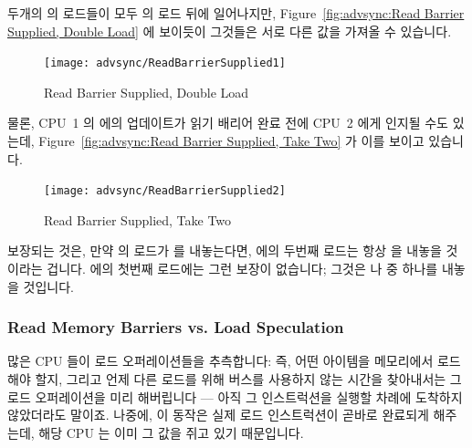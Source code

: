 \begin{enumerate}
두개의  의 로드들이 모두  의 로드 뒤에 일어나지만,
Figure~\ref{fig:advsync:Read Barrier Supplied, Double Load} 에 보이듯이
그것들은 서로 다른 값을 가져올 수 있습니다.

\begin{figure}[htbp]
\centering
\texttt{[image: advsync/ReadBarrierSupplied1]}
\caption{Read Barrier Supplied, Double Load}
\end{figure}

물론, CPU~1 의  에의 업데이트가 읽기 배리어 완료 전에 CPU~2 에게 인지될
수도 있는데, Figure~\ref{fig:advsync:Read Barrier Supplied, Take Two} 가 이를
보이고 있습니다.

\begin{figure}[htbp]
\centering
\texttt{[image: advsync/ReadBarrierSupplied2]}
\caption{Read Barrier Supplied, Take Two}
\end{figure}

보장되는 것은, 만약  의 로드가  를 내놓는다면,  에의
두번째 로드는 항상  을 내놓을 것이라는 겁니다.
 에의 첫번째 로드에는 그런 보장이 없습니다; 그것은  나
 중 하나를 내놓을 것입니다.

\subsubsection{Read Memory Barriers vs. Load Speculation}
\label{sec:advsync:Read Memory Barriers vs. Load Speculation}

많은 CPU 들이 로드 오퍼레이션들을 추측합니다: 즉, 어떤 아이템을 메모리에서
로드해야 할지, 그리고 언제 다른 로드를 위해 버스를 사용하지 않는 시간을
찾아내서는 그 로드 오퍼레이션을 미리 해버립니다 --- 아직 그 인스트럭션을 실행할
차례에 도착하지 않았더라도 말이죠.
나중에, 이 동작은 실제 로드 인스트럭션이 곧바로 완료되게 해주는데, 해당 CPU 는
이미 그 값을 쥐고 있기 때문입니다.


\end{enumerate}
